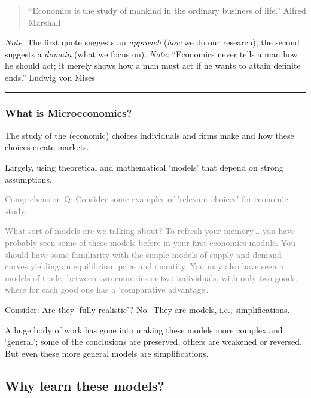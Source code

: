 \documentclass[]{article}
\begin{document}
\begin{quote}
``Economics is the study of mankind in the ordinary business of life.'' Alfred Marshall
\end{quote}

\emph{Note}: The first quote suggests an \emph{approach} (\emph{how} we do our research), the second suggests a \emph{domain} (what we focus on).
\emph{Note:} ``Economics never tells a man how he should act; it merely shows how a man must act if he wants to attain definite ends.'' Ludwig von Mises

\begin{center}\rule{0.5\linewidth}{\linethickness}\end{center}

\hypertarget{what-is-microeconomics}{%
\subsubsection{What is Microeconomics?}\label{what-is-microeconomics}}

The study of the (economic) choices individuals and firms make and how these choices create markets.

\bigskip

Largely, using theoretical and mathematical `models' that depend on strong assumptions.

\textcolor{gray}{Comprehension Q: Consider some examples of 'relevant choices' for economic study. }

\textcolor{gray}{What sort of models are we talking about?
To refresh your memory... you have probably seen some of these models before in your first economics module. You should have some familiarity with the simple models of supply and demand curves yielding an equilibrium price and quantity. You may also have seen a models of trade, between two countries or two individuals, with only two goods, where for each good one has a 'comparative advantage'.
}

Consider: Are they `fully realistic'? No.~They are models, i.e., simplifications.

A huge body of work has gone into making these models more complex and `general'; some of the conclusions are preserved, others are weakened or reversed. But even these more general models are simplifications.

\hypertarget{why-learn-these-models}{%
\subsection{Why learn these models?}\label{why-learn-these-models}}
\end{document}
